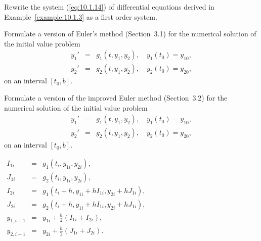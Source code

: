 \documentclass{ximera}
\begin{document}
\begin{problem}\label{exer:10.1.6}
Rewrite the system (\ref{eq:10.1.14}) of differential equations derived in
Example~\ref{example:10.1.3}   as a first order system.
\end{problem}

\begin{problem}\label{exer:10.1.7}
Formulate a version of Euler's method (Section~3.1)
for the numerical solution of the initial value problem
$$
\begin{array}{rcl}
y_1'&=&g_1(t,y_1,y_2),\quad y_1(t_0)=y_{10},\\
y_2'&=&g_2(t,y_1,y_2),\quad y_2(t_0)=y_{20},
\end{array}
$$
on an interval $[t_0,b]$.
\end{problem}


\begin{problem}\label{exer:10.1.8}
Formulate a version of the improved Euler method
(Section~3.2)
for the numerical solution of the initial value problem
$$
\begin{array}{rcl}
y_1'&=&g_1(t,y_1,y_2),\quad y_1(t_0)=y_{10},\\
y_2'&=&g_2(t,y_1,y_2),\quad y_2(t_0)=y_{20},
\end{array}
$$
on an interval $[t_0,b]$.

\begin{solution}

    $\begin{array}{rcl}
I_{1i}&=&g_1(t_i,y_{1i},y_{2i}),\\
J_{1i}&=&g_2(t_i,y_{1i},y_{2i}),\\
I_{2i}&=&g_1\left(t_i+h,y_{1i}+hI_{1i},y_{2i}+hJ_{1i}\right),\\
J_{2i}&=&g_2\left(t_i+h,y_{1i}+hI_{1i},y_{2i}+hJ_{1i}\right),\\
y_{1,i+1}&=&y_{1i}+\frac{h}{2}(I_{1i}+I_{2i}),\\
y_{2,i+1}&=&y_{2i}+\frac{h}{2}(J_{1i}+J_{2i}).
\end{array}$
\end{solution}
\end{problem}
\end{document}

